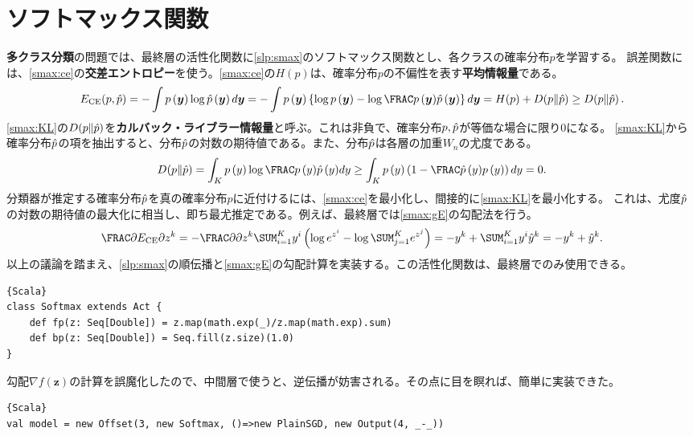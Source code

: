 \documentclass[10pt,a4paper]{book}
\begin{document}
\section{ソフトマックス関数\label{sect:smax}}

\textbf{多クラス分類}の問題では、最終層の活性化関数に\eqref{slp:smax}のソフトマックス関数とし、各クラスの確率分布$p$を学習する。
誤差関数には、\eqref{smax:ce}の\textbf{交差エントロピー}を使う。\eqref{smax:ce}の$H(p)$は、確率分布$p$の不偏性を表す\textbf{平均情報量}である。
%
\begin{equation}
\label{eq:smax:ce}
\Ece(p,\hatp) =
-\int \prob{\bm{y}} \log \hatprob{\bm{y}} d\bm{y} =
-\int \prob{\bm{y}} \left\{\log \prob{\bm{y}} - \log\frac{\prob{\bm{y}}}{\hatprob{\bm{y}}}\right\} d\bm{y} =
H(p) + \KL{p}{\hatp} \geq
\KL{p}{\hatp}.
\end{equation}
%
\eqref{smax:KL}の$D\!\left(p\|\hat{p}\right)$を\textbf{カルバック・ライブラー情報量}と呼ぶ。これは非負で、確率分布$p,\hat{p}$が等価な場合に限り$0$になる。
\eqref{smax:KL}から確率分布$\hat{p}$の項を抽出すると、分布$\hat{p}$の対数の期待値である。また、分布$\hat{p}$は各層の加重$W_n$の尤度である。
%
\begin{equation}
\label{eq:smax:KL}
\KL{p}{\hatp} =
\int_K \prob{y} \log \frac{\prob{y}}{\hatprob{y}} dy \geq \int_K \prob{y} \tup{1-\frac{\hatprob{y}}{\prob{y}}} dy = 0.
\end{equation}
%
分類器が推定する確率分布$\hat{p}$を真の確率分布$p$に近付けるには、\eqref{smax:ce}を最小化し、間接的に\eqref{smax:KL}を最小化する。
これは、尤度$\hat{p}$の対数の期待値の最大化に相当し、即ち最尤推定である。例えば、最終層では\eqref{smax:gE}の勾配法を行う。
%
\begin{equation}
\label{eq:smax:gE}
\pdiff{\Ece}{z^k}
= - \pdiff{}{z^k} \sum_{i=1}^K y^i \tup{\log e^{z^i} - \log \sum_{j=1}^K e^{z^j}}
= - y^k + \sum_{i=1}^K y^i \hat{y}^k = -y^k + \hat{y}^k.
\end{equation}
%
以上の議論を踏まえ、\eqref{slp:smax}の順伝播と\eqref{smax:gE}の勾配計算を実装する。この活性化関数は、最終層でのみ使用できる。

\begin{Verbatim}{Scala}
class Softmax extends Act {
	def fp(z: Seq[Double]) = z.map(math.exp(_)/z.map(math.exp).sum)
	def bp(z: Seq[Double]) = Seq.fill(z.size)(1.0)
}
\end{Verbatim}

勾配$\nabla f(\bm{z})$の計算を誤魔化したので、中間層で使うと、逆伝播が妨害される。その点に目を瞑れば、簡単に実装できた。

\begin{Verbatim}{Scala}
val model = new Offset(3, new Softmax, ()=>new PlainSGD, new Output(4, _-_))
\end{Verbatim}
\end{document}
